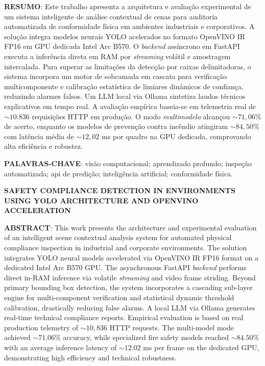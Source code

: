 \documentclass[a4paper,11pt]{article}
\begin{document}


\vspace{0.15cm}
\noindent\textbf{RESUMO}: Este trabalho apresenta a arquitetura e avaliação experimental de um sistema inteligente de análise contextual de cenas para auditoria automatizada de conformidade física em ambientes industriais e corporativos. A solução integra modelos neurais YOLO acelerados no formato OpenVINO IR FP16 em GPU dedicada Intel Arc B570. O \textit{backend} assíncrono em FastAPI executa a inferência direta em RAM por \textit{streaming} volátil e amostragem intercalada. Para superar as limitações da detecção por caixas delimitadoras, o sistema incorpora um motor de sobcamada em cascata para verificação multicomponente e calibração estatística de limiares dinâmicos de confiança, reduzindo alarmes falsos. Um LLM local via Ollama sintetiza laudos técnicos explicativos em tempo real. A avaliação empírica baseia-se em telemetria real de $\sim 10.836$ requisições HTTP em produção. O modo \textit{multimodelo} alcançou $\sim 71{,}06\%$ de acerto, enquanto os modelos de prevenção contra incêndio atingiram $\sim 84{,}50\%$ com latência média de $\sim 12{,}02$ ms por quadro na GPU dedicada, comprovando alta eficiência e robustez.

\vspace{0.15cm}
\noindent\textbf{PALAVRAS-CHAVE}: visão computacional; aprendizado profundo; inspeção automatizada; api de predição; inteligência artificial; conformidade física.

\vspace{0.15cm}
\begin{center}
\textbf{SAFETY COMPLIANCE DETECTION IN ENVIRONMENTS USING YOLO ARCHITECTURE AND OPENVINO ACCELERATION}
\end{center}

\noindent\textbf{ABSTRACT}: This work presents the architecture and experimental evaluation of an intelligent scene contextual analysis system for automated physical compliance inspection in industrial and corporate environments. The solution integrates YOLO neural models accelerated via OpenVINO IR FP16 format on a dedicated Intel Arc B570 GPU. The asynchronous FastAPI \textit{backend} performs direct in-RAM inference via volatile \textit{streaming} and video frame striding. Beyond primary bounding box detection, the system incorporates a cascading sub-layer engine for multi-component verification and statistical dynamic threshold calibration, drastically reducing false alarms. A local LLM via Ollama generates real-time technical compliance reports. Empirical evaluation is based on real production telemetry of $\sim 10,836$ HTTP requests. The multi-model mode achieved $\sim 71.06\%$ accuracy, while specialized fire safety models reached $\sim 84.50\%$ with an average inference latency of $\sim 12.02$ ms per frame on the dedicated GPU, demonstrating high efficiency and technical robustness.
\end{document}
